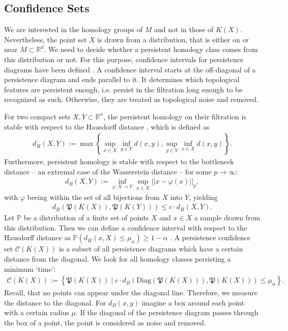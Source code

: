 \documentclass[envcountsect,runningheads]{llncs}
\begin{document}
\subsection{Confidence Sets}
We are interested in the homology groups of $M$ and not in those of $K(X)$. Nevertheless, the point set $X$ is drawn from a distribution, that is either on or near $M \subset \mathbb{R}^d$. We need to decide whether a persistent homology class comes from this distribution or not. For this purpose, confidence intervals for persistence diagrams have been defined . A confidence interval starts at the off-diagonal of a persistence diagram and ends parallel to it. It determines which topological features are persistent enough, i.e. persist in the filtration long enough to be recognized as such. Otherwise, they are treated as topological noise and removed.

For two compact sets $X,Y \subset \mathbb{R}^n$, the persistent homology on their filtration is stable with respect to the Hausdorff distance , which is defined as
\begin{align}
d_H(X,Y) := \max\left\{\sup_{x \in X} \inf_{y \in Y} d(x,y), \sup_{y \in Y} \inf_{x \in X} d(x,y) \right\}.
\end{align}
Furthermore, persistent homology is stable with respect to the bottleneck distance -- an extremal case of the Wasserstein distance -- for some $p \rightarrow \infty$:
\begin{align}
d_B(X,Y) := \inf_{\varphi: X \rightarrow Y} \sup_{x \in X} ||x-\varphi(x)||_p,
\end{align}
with $\varphi$ beeing within the set of all bijections from $X$ into $Y$, yielding
\begin{align}
	d_B\left(\mathfrak{P}\left(K\left(X\right)\right), \mathfrak{P}\left(K\left(Y\right)\right)\right) \leq c \cdot d_H\left(X,Y\right).
\end{align}
Let $\mathbb{P}$ be a distribution of a finite set of points $X$ and $x \in X$ a sample drawn from this distribution. Then we can define a confidence interval with respect to the Hausdorff distance as $\mathbb{P}\left( d_H(x,X) \leq \mu_\alpha \right) \geq 1-\alpha$ . A persistence confidence set $\mathscr{C}(K(X))$ is a subset of all persistence diagrams which have a certain distance from the diagonal. We look for all homology classes persisting a minimum `time':
\begin{align}
	\mathscr{C}(K(X)) := \left\{ \mathfrak{P}(K(X)) \; \bigg\vert \; c \cdot d_B\left(\text{Diag}\left(\mathfrak{P}\left(K\left(X\right)\right)\right), \mathfrak{P}\left(K\left(X\right)\right) \right) \leq \mu_\alpha \right\}.
\end{align}
Recall, that no points can appear under the diagonal line. Therefore, we measure the distance to the diagonal. For $d_B(x,y)$ imagine a box around each point with a certain radius $\mu$. If the diagonal of the persistence diagram passes through the box of a point, the point is considered as noise and removed.
\end{document}
